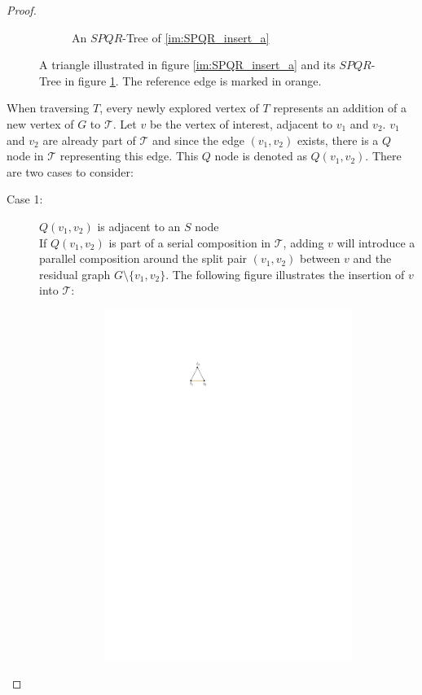 \begin{proof}
\begin{figure}[H]
\begin{subfigure}{0.4\textwidth}
			\caption{An $SPQR$-Tree of \ref{im:SPQR_insert_a}}\label{im:SPQR_insert_b}
		\end{subfigure}
		\caption{A triangle illustrated in figure \ref{im:SPQR_insert_a} and its $SPQR$-Tree in figure \ref{im:SPQR_insert_b}. The reference edge is marked in orange.}\label{im:SPQR_insert_1}
	\end{figure}
	When traversing $T$, every newly explored vertex of $T$ represents an addition of a new vertex of $G$ to $\mathcal{T}$. Let $v$ be the vertex of interest, adjacent to $v_1$ and $v_2$. $v_1$ and $v_2$ are already part of $\mathcal{T}$ and since the edge $(v_1,v_2)$ exists, there is a $Q$ node in $\mathcal{T}$ representing this edge. This $Q$ node is denoted as $Q(v_1,v_2)$. There are two cases to consider:
	\begin{description}
		\item[Case 1:] $Q(v_1,v_2)$ is adjacent to an $S$ node\\
		If $Q(v_1,v_2)$ is part of a serial composition in $\mathcal{T}$, adding $v$ will introduce a parallel composition around the split pair $(v_1,v_2)$ between $v$ and the residual graph $G\setminus\{v_1,v_2\}$. The following figure illustrates the insertion of $v$ into $\mathcal{T}$:
		\begin{figure}[H]
			\begin{subfigure}{\textwidth}
				\centering
				\includegraphics[page=3,width=\linewidth]{graphics/SP_graphs_SPQR_inserting.pdf}

\end{subfigure}
\end{figure}
\end{description}
\end{proof}
